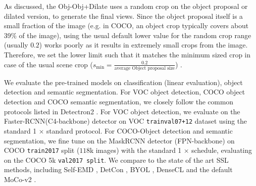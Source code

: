 As discussed, the Obj-Obj+Dilate uses a random crop on the object proposal or dilated version, to generate the final views. Since the object proposal itself is a small fraction of the image (e.g. in COCO, an object crop typically covers about 39\% of the image), using the usual default lower value for the random crop range (usually $0.2$) works poorly as it results in extremely small crops from the image. Therefore, we set the lower limit such that it matches the minimum sized crop in case of the usual scene crop ($s_{\text{min}} = \frac{0.2}{\text{average Object proposal size}}$) . 

We evaluate the pre-trained models on classification (linear evaluation), object detection and semantic segmentation. For VOC object detection, COCO object detection and COCO semantic segmentation, we closely follow the common protocols listed in Detectron2 \cite{wu2019detectron2}. For VOC object detection, we evaluate on the Faster-RCNN(C4-backbone) \cite{Ren2015FasterRT} detector on VOC \texttt{trainval07+12} dataset  using the standard 1 $\times$  standard protocol. For COCO-Object detection and semantic segmentation, we fine tune on the MaskRCNN detector (FPN-backbone) \cite{he2018mask} on COCO \texttt{train2017} split ($118$k images) with the standard 1 $\times$ schedule, evaluating on the COCO 5k \texttt{val2017 split}. We compare to the state of the art SSL methods, including Self-EMD \cite{liu2021selfemd}, DetCon \cite{henaff2021efficient}, BYOL \cite{richemond2020byol}, DenseCL \cite{wang2021dense} and the default MoCo-v2 \cite{chen2020improved}. 



